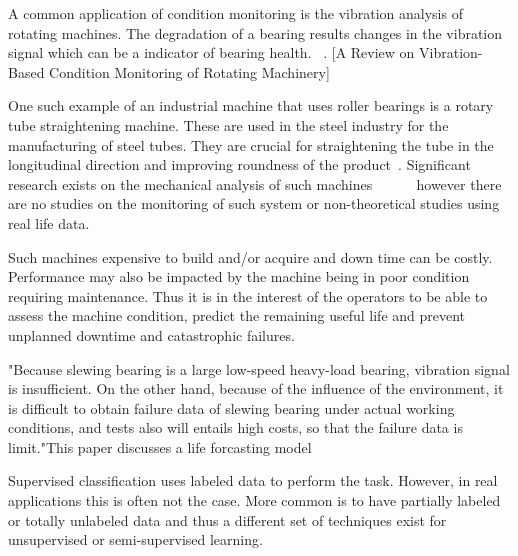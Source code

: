 \documentclass{article}
\begin{document}
A common application of condition monitoring is the vibration analysis of rotating machines. The degradation of a bearing results changes in the vibration signal which can be a indicator of bearing health. ~\cite{soualhi2021novel}.
[A Review on Vibration-Based Condition Monitoring of Rotating Machinery]

One such example of an industrial machine that uses roller bearings is a rotary tube straightening machine. These are used in the steel industry for the manufacturing of steel tubes. They are crucial for straightening the tube in the longitudinal direction and improving roundness of the product~\cite{yoshimura2009effect}. Significant research exists on the mechanical analysis of such machines ~\cite{kato2014straightening}~\cite{ma2020effect}~\cite{ma2021analysis}~\cite{yu2018theoretical}~\cite{das1991mechanics} however there are no studies on the monitoring of such system or non-theoretical studies using real life data.

Such machines expensive to build and/or acquire and down time can be costly. Performance may also be impacted by the machine being in poor condition requiring maintenance. Thus it is in the interest of the operators to be able to assess the machine condition, predict the remaining useful life and prevent unplanned downtime and catastrophic failures.

"Because slewing bearing is a large low-speed heavy-load bearing, vibration signal is insufficient. On the other hand, because of the influence of the
environment, it is difficult to obtain failure data of slewing bearing under actual working conditions, and tests also will entails high costs, so that the failure data is limit."This paper discusses a life forcasting model~\cite{wang2016multiple}

Supervised classification uses labeled data to perform the task. However, in real applications this is often not the case. More common is to have partially labeled or totally unlabeled data and thus a different set of techniques exist for unsupervised or semi-supervised learning.
\end{document}
